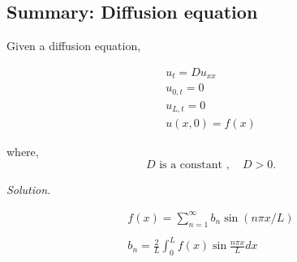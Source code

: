 \documentclass[a4]{article}
\begin{document}
\subsection{Summary: Diffusion equation}
Given a diffusion equation,\par 
\begin{equation}\begin{array}{c}
u_{t}=D u_{x x}\\
u_{0,t} = 0\\
u_{L,t} = 0\\
u(x, 0)=f(x)
\end{array}\end{equation}\par 
where,
\begin{equation}
D \text{  is a constant },\quad D>0.
\end{equation}\par
\bigbreak
\bigbreak
\noindent \textsl{Solution.}\par 

\begin{equation}\begin{array}{c}
f(x)=\sum_{n=1}^{\infty} b_{n} \sin (n \pi x / L)\\
\quad\\
b_{n}=\frac{2}{L} \int_{0}^{L} f(x) \sin \frac{n \pi x}{L} d x
\end{array}\end{equation}
\end{document}
